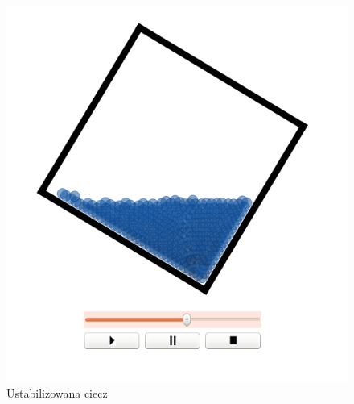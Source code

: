\begin{minipage}{0.5\textwidth}
\begin{figure}[H]
 \begin{center}
  \includegraphics[width=\textwidth]{./rysunki/obrot_stabilny}
 \end{center}
 \caption{Ustabilizowana ciecz}
 \label{fig:obrot_stabilny}
\end{figure}
\end{minipage}\\[0.1cm]

